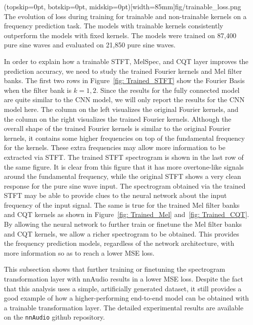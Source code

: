 \documentclass{ieeeaccess}
\newcommand{\nbh}[1]{\texttt{#1}}
\begin{document}
\Figure(topskip=0pt, botskip=0pt, midskip=0pt)[width=85mm]{fig/trainable_loss.png}
{The evolution of loss during training for trainable and non-trainable kernels on a frequency prediction task. The models with trainable kernels consistently outperform the models with fixed kernels. The models were trained on 87,400 pure sine waves and evaluated on 21,850 pure sine waves.\label{fig: trainable_loss}}


In order to explain how a trainable STFT, MelSpec, and CQT layer improves the prediction accuracy, we need to study the trained Fourier kernels and Mel filter banks. The first two rows in Figure~\ref{fig: Trained_STFT} show the Fourier Basis when the filter bank is $k=1,2$. Since the results for the fully connected model are quite similar to the CNN model, we will only report the results for the CNN model here. The column on the left visualizes the original Fourier kernels, and the column on the right visualizes the trained Fourier kernels. Although the overall shape of the trained Fourier kernels is similar to the original Fourier kernels, it contains some higher frequencies on top of the fundamental frequency for the kernels. These extra frequencies may allow more information to be extracted via STFT. The trained STFT spectrogram is shown in the last row of the same figure. It is clear from this figure that it has more overtone-like signals around the fundamental frequency, while the original STFT shows a very clean response for the pure sine wave input. The spectrogram obtained via the trained STFT may be able to provide clues to the neural network about the input frequency of the input signal. The same is true for the trained Mel filter banks and CQT kernels as shown in Figure~\ref{fig: Trained_Mel} and~\ref{fig: Trained_CQT}. By allowing the neural network to further train or finetune the Mel filter banks and CQT kernels, we allow a richer spectrogram to be obtained. This provides the frequency prediction models, regardless of the network architecture, with more information so as to reach a lower MSE loss.

This subsection shows that further training or finetuning the spectrogram transformation layer with nnAudio results in a lower MSE loss. Despite the fact that this analysis uses a simple, artificially generated dataset, it still provides a good example of how a higher-performing end-to-end model can be obtained with a trainable transformation layer. The detailed experimental results are available on the \nbh{nnAudio} github repository\footnotemark[2].
\end{document}
